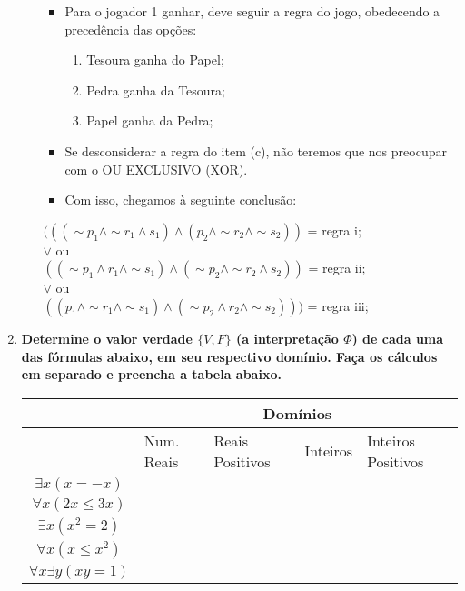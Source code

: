 \documentclass[a4paper,12pt]{article}
\begin{document}
\begin{enumerate}
\begin{enumerate}
\begin{itemize}
   \item Para o jogador 1 ganhar, deve seguir a regra do jogo, obedecendo a precedência das opções:
   \begin{enumerate}
      \item Tesoura ganha do Papel;
      \item Pedra ganha da Tesoura;
      \item Papel ganha da Pedra;
   \end{enumerate}
    \item Se desconsiderar a regra do item (c), não teremos que nos preocupar com o OU EXCLUSIVO (XOR).
    \item Com isso, chegamos à seguinte conclusão:
\end{itemize}
\begin{center}
   $(((\sim p_1 \wedge \sim r_1 \wedge s_1) \wedge (p_2 \wedge \sim r_2 \wedge \sim s_2))$ = regra i;\\
   $ \vee $ ou \\
   $((\sim p_1 \wedge r_1 \wedge \sim s_1) \wedge (\sim p_2 \wedge \sim r_2 \wedge s_2))$ = regra ii;\\
   $ \vee $ ou  \\
   $((p_1 \wedge \sim r_1 \wedge \sim s_1) \wedge (\sim p_2 \wedge r_2 \wedge \sim s_2)))$ = regra iii;\\
\end{center}


\end{enumerate}

\item {\bf Determine o valor verdade $\{V, F \}$ (a interpretação $\Phi $)
de cada uma das fórmulas abaixo, em seu respectivo domínio.
Faça os cálculos em separado e preencha a tabela abaixo.}

\begin{center}
\begin{tabular}{|c|l|l|l|l|} \hline
 & \multicolumn{4}{c|}{Domínios} \\ \hline
 & Num. Reais & Reais Positivos & Inteiros & Inteiros Positivos \\ \hline
$\exists x (x = -x)$ & & & & \\ \hline
$\forall x (2x \leq 3x)$ & & & & \\ \hline
$\exists x (x^2 = 2)$ & & & & \\ \hline
$\forall x (x \leq x^2)$ & & & & \\ \hline
$\forall x \exists y (xy = 1)$ & & & & \\ \hline
\end{tabular}
\end{center}



\end{enumerate}
\end{document}
